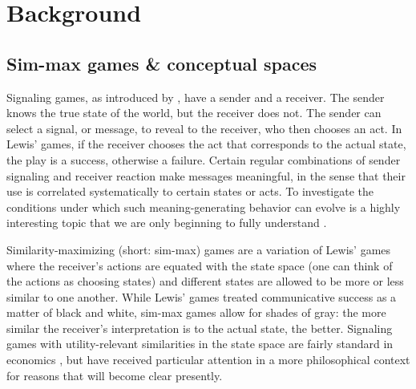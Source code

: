 \documentclass[fleqn,reqno,10pt]{article}
\begin{document}
\section{Background}
\label{sec:background}


\subsection{Sim-max games \& conceptual spaces}

Signaling games, as introduced by \citet{Lewis_1969:Convention}, have
a sender and a receiver. The sender knows the true state of the world,
but the receiver does not. The sender can select a signal, or message,
to reveal to the receiver, who then chooses an act. In Lewis' games,
if the receiver chooses the act that corresponds to the actual state,
the play is a success, otherwise a failure. Certain regular
combinations of sender signaling and receiver reaction make messages
meaningful, in the sense that their use is correlated systematically
to certain states or acts. To investigate the conditions under which
such meaning-generating behavior can evolve is a highly interesting
topic that we are only beginning to fully understand
\citep[e.g.][]{Warneryd1993:Cheap-Talk-Coor,BlumeKim1993:Evolutionary-St,Huttegger2007:Evolution-and-t,Pawlowitsch2008:Why-Evolution-d,Barrett2009:The-Evolution-o,HutteggerSkyrms2010:Evolutionary-Dy,Skyrms2010:Signals}.

Similarity-maximizing (short: sim-max) games are a variation of Lewis' games where the
receiver's actions are equated with the state space (one can think of the actions as choosing
states) and different states are allowed to be more or less similar to one another. While
Lewis' games treated communicative success as a matter of black and white, sim-max games allow
for shades of gray: the more similar the receiver's interpretation is to the actual state, the
better. Signaling games with utility-relevant similarities in the state space are fairly
standard in economics
\citep[e.g.][]{Spence1973:Job-market-sign,CrawfordSobel1982:Strategic-Infor}, but have received
particular attention in a more philosophical context for reasons that will become clear
presently.
\end{document}
